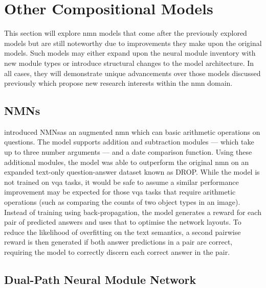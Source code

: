 \graphicspath{{content/chapters/literature_review/other_compositional_models/figures}}

\section{Other Compositional Models}
\label{sec:other_compositional_models}

This section will explore \gls{nmn} models that come after the previously explored models but are still noteworthy due to improvements they make upon the original models.
Such models may either expand upon the neural module inventory with new module types or introduce structural changes to the model architecture.
In all cases, they will demonstrate unique advancements over those models discussed previously which propose new research interests within the \gls{nmn} domain.

\subsection{NMNs\pm}
\label{subsec:nmn_plus_minus}

\citeauthor{chen_teaching_2022} introduced NMNs\pm as an augmented \gls{nmn} which can basic arithmetic operations on questions.
The model supports addition and subtraction modules --- which take up to three number arguments --- and a date comparison function.
Using these additional modules, the model was able to outperform the original \gls{nmn} on an expanded text-only question-answer dataset known as DROP.
While the model is not trained on \gls{vqa} tasks, it would be safe to assume a similar performance improvement may be expected for those \gls{vqa} tasks that require arithmetic operations (such as comparing the counts of two object types in an image).
Instead of training using back-propagation, the model generates a reward for each pair of predicted answers and uses that to optimise the network layouts.
To reduce the likelihood of overfitting on the text semantics, a second pairwise reward is then generated if both answer predictions in a pair are correct, requiring the model to correctly discern each correct answer in the pair.


\subsection{Dual-Path Neural Module Network}
\label{subsec:dual_path_neural_module_network}


